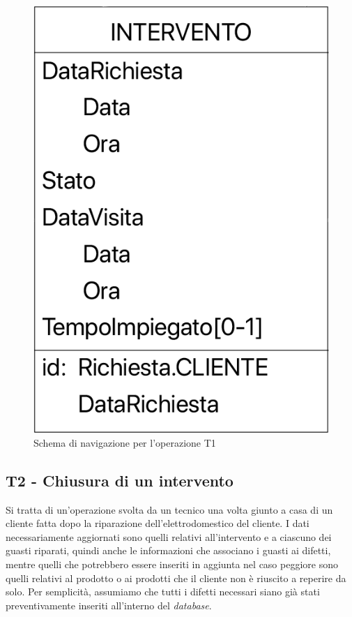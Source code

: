 \documentclass[a4paper, 12pt]{report}
\begin{document}
\begin{figure}[H]
	\centering
	\includegraphics{images/T1.png}
	\caption{Schema di navigazione per l'operazione T1}
\end{figure}

\subsection{T2 - Chiusura di un intervento}

Si tratta di un'operazione svolta da un tecnico una volta giunto a casa di un cliente fatta dopo la riparazione dell'elettrodomestico del cliente. I dati necessariamente
aggiornati sono quelli relativi all'intervento e a ciascuno dei guasti riparati, quindi anche le informazioni che associano i guasti ai difetti, mentre quelli che potrebbero essere inseriti
in aggiunta nel caso peggiore sono quelli relativi al prodotto o ai prodotti che il cliente non è riuscito a reperire da solo. Per semplicità, assumiamo che tutti i difetti necessari siano
già stati preventivamente inseriti all'interno del \textit{database}.
\end{document}
